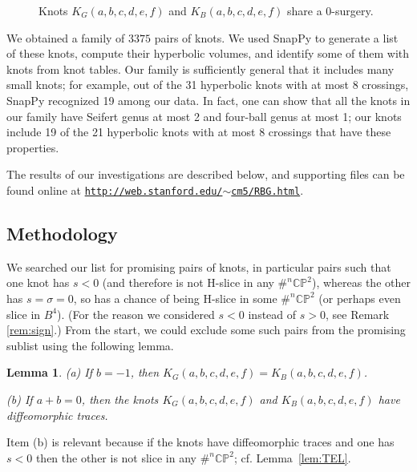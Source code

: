 \documentclass [11pt]{amsart}
\newtheorem {lemma}[theorem]{Lemma}
\theoremstyle{remark}
\def\CP{\mathbb{CP}^2}
\begin{document}
\begin{figure}
{
   \fontsize{9pt}{11pt}\selectfont
   \def\svgwidth{4.8in}
   
}
\caption{Knots $K_G(a, b, c, d, e, f)$ and $K_B(a, b, c, d, e, f)$ share a 0-surgery.}
\label{fig:KbKg}
\end{figure}


We obtained a family of $3375$ pairs of knots. We used SnapPy \cite{SnapPy} to generate a list of these knots, compute their hyperbolic volumes, and identify some of them with knots from knot tables. Our family is sufficiently general that it includes many small knots; for example, out of the 31 hyperbolic knots with at most 8 crossings, SnapPy recognized 19 among our data. In fact, one can show that all the knots in our family have Seifert genus at most 2 and four-ball genus at most 1; our knots include 19 of the 21 hyperbolic knots with at most 8 crossings that have these properties. 

The results of our investigations are described below, and supporting files can be found online at 
\href{http://web.stanford.edu/~cm5/RBG.html}{\tt http://web.stanford.edu/$\sim$cm5/RBG.html}.


\subsection{Methodology}
We searched our list for promising pairs of knots, in particular pairs such that one knot has $s < 0$ (and therefore is not H-slice in any $\#^n \CP$), whereas the other has $s=\sigma=0$, so has a chance of being H-slice in some $\#^n \CP$ (or perhaps even slice in $B^4$). (For the reason we considered $s<0$ instead of $s>0$, see Remark \ref{rem:sign}.) From the start, we could exclude some such pairs from the promising sublist using the following lemma. 


\begin{lemma}
\label{lemma:ab}
(a) If $b=-1$, then $K_G(a, b, c, d, e, f)=K_B(a, b, c, d, e, f)$.

(b) If $a+b=0$, then the  knots $K_G(a, b, c, d, e, f)$ and $K_B(a, b, c, d, e, f)$ have diffeomorphic traces.
\end{lemma}
Item (b) is relevant because if the knots have diffeomorphic traces and one has $s<0$ then the other is not slice in any $\#^n \CP$; cf. Lemma~\ref{lem:TEL}. 
\end{document}
